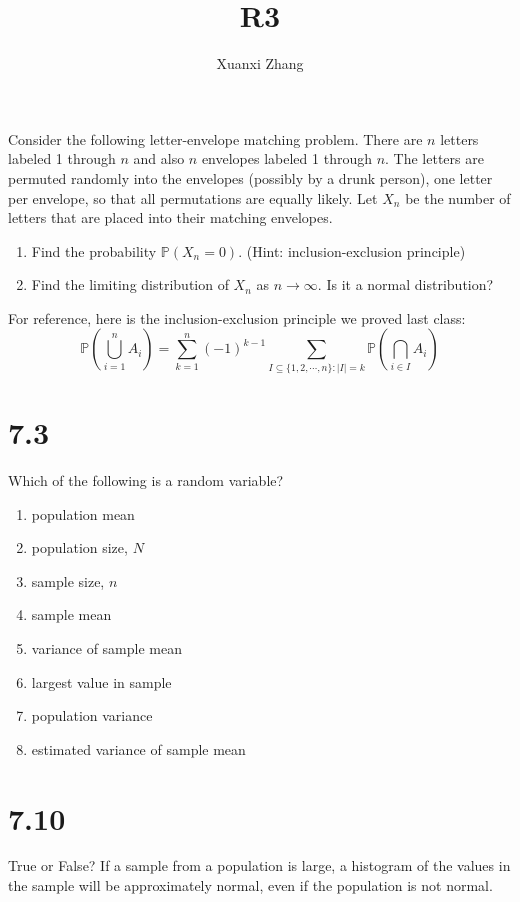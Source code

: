 \documentclass{article}%
\title{\huge R3\\
\normalsize}
\author{Xuanxi Zhang}
\begin{document}
\maketitle
\section{}
Consider the following letter-envelope matching problem. There are $n$ letters labeled 1 through $n$ and also $n$ envelopes labeled 1 through $n$. The letters are permuted randomly into the envelopes (possibly by a drunk person), one letter per envelope, so that all permutations are equally likely. Let $X_n$ be the number of letters that are placed into their matching envelopes.
\begin{enumerate}
    \item Find the probability $\mathbb{P}\left(X_n=0\right)$. (Hint: inclusion-exclusion principle)
    \item Find the limiting distribution of $X_n$ as $n \rightarrow \infty$. Is it a normal distribution?

\end{enumerate}
For reference, here is the inclusion-exclusion principle we proved last class:
$$
\mathbb{P}\left(\bigcup_{i=1}^n A_i\right)=\sum_{k=1}^n(-1)^{k-1} \sum_{I \subseteq\{1,2, \cdots, n\}:|I|=k} \mathbb{P}\left(\bigcap_{i \in I} A_i\right)
$$

\section{7.3} Which of the following is a random variable?
\begin{enumerate}
    \item population mean
    \item population size, $N$
    \item sample size, $n$
    \item sample mean
    \item variance of sample mean
    \item largest value in sample
    \item population variance
    \item estimated variance of sample mean
\end{enumerate}

\section{7.10}
 True or False? If a sample from a population is large, a histogram of the values in the sample will be approximately normal, even if the population is not normal.
\end{document}
